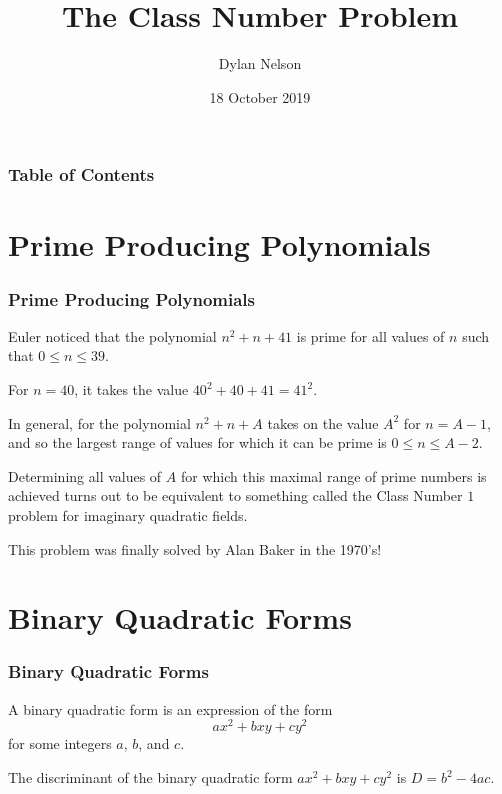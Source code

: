\documentclass[handout]{beamer}
\title{The Class Number Problem}
\author{Dylan Nelson}
\institute{Stellenbosch University}
\date{18 October 2019}
\begin{document}
\frame{\titlepage}

\begin{frame}

	\frametitle{Table of Contents}
	\tableofcontents

\end{frame}

\section{Prime Producing Polynomials}

\begin{frame}
	
	\frametitle{Prime Producing Polynomials}

	Euler noticed that the polynomial $n^2 + n + 41$ is prime for all values of $n$ such that $0 \leq n \leq 39$. \pause

	For $n = 40$, it takes the value $40^2 + 40 + 41 = 41^2$. \pause

	In general, for the polynomial $n^2 + n + A$ takes on the value $A^2$ for $n = A - 1$, and so the largest range of values for which it can be prime is $0 \leq n \leq A - 2$. \pause

	Determining all values of $A$ for which this maximal range of prime numbers is achieved turns out to be equivalent to something called the Class Number $1$ problem for imaginary quadratic fields. \pause

	This problem was finally solved by Alan Baker in the 1970's!

\end{frame}

\section{Binary Quadratic Forms}

\begin{frame}

	\frametitle{Binary Quadratic Forms}

	\begin{definition}
		A binary quadratic form is an expression of the form
		\[
			ax^2 + bxy + cy^2
		\]
		for some integers $a$, $b$, and $c$.
	\end{definition}
	\pause

	\begin{definition}[Discriminant]
		The discriminant of the binary quadratic form $ax^2 + bxy + cy^2$ is $D = b^2 - 4ac$.
	\end{definition}

\end{frame}
\end{document}
